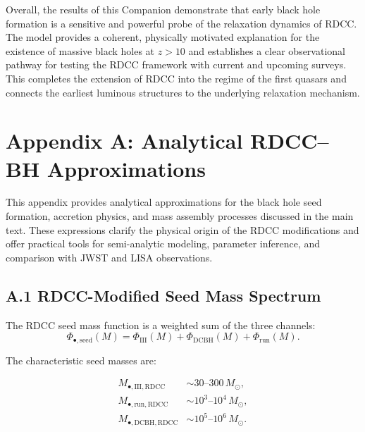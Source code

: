 \documentclass[11pt,a4paper]{article}
\begin{document}
Overall, the results of this Companion demonstrate that early black hole formation is a 
sensitive and powerful probe of the relaxation dynamics of RDCC. The model provides a 
coherent, physically motivated explanation for the existence of massive black holes at 
$z > 10$ and establishes a clear observational pathway for testing the RDCC framework with 
current and upcoming surveys. This completes the extension of RDCC into the regime of the 
first quasars and connects the earliest luminous structures to the underlying relaxation 
mechanism.

\section*{Appendix A: Analytical RDCC–BH Approximations}

This appendix provides analytical approximations for the black hole seed formation, accretion 
physics, and mass assembly processes discussed in the main text. These expressions clarify the 
physical origin of the RDCC modifications and offer practical tools for semi-analytic modeling, 
parameter inference, and comparison with JWST and LISA observations.

\subsection*{A.1 RDCC-Modified Seed Mass Spectrum}

The RDCC seed mass function is a weighted sum of the three channels:
\begin{equation}
    \Phi_{\bullet,\mathrm{seed}}(M)
    = \Phi_{\mathrm{III}}(M)
    + \Phi_{\mathrm{DCBH}}(M)
    + \Phi_{\mathrm{run}}(M).
\end{equation}

The characteristic seed masses are:

\begin{align}
    M_{\bullet,\mathrm{III,RDCC}} &\sim 30\text{--}300\,M_{\odot}, \\
    M_{\bullet,\mathrm{run,RDCC}} &\sim 10^{3}\text{--}10^{4}\,M_{\odot}, \\
    M_{\bullet,\mathrm{DCBH,RDCC}} &\sim 10^{5}\text{--}10^{6}\,M_{\odot}.
\end{align}
\end{document}

